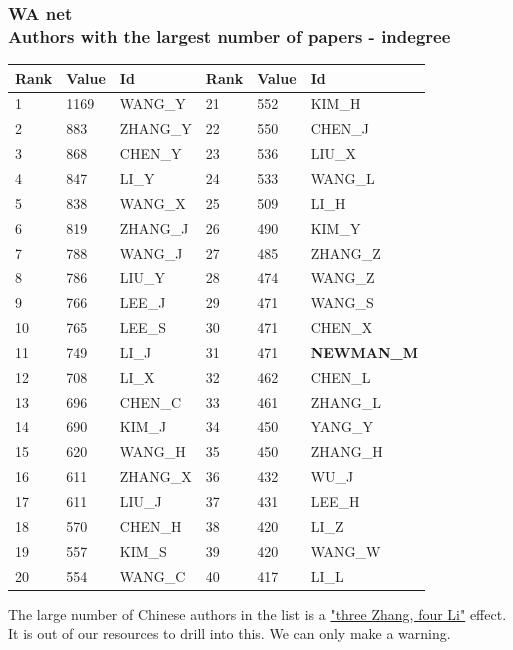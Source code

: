 \documentclass[hyperref={pdfstartview={FitBH -32768},
                         pdfpagemode=FullScreen,
                         plainpages=false,
                         colorlinks=true}
              ]{beamer}
\begin{document}
\begin{frame}[fragile]
\frametitle{WA net \label{numpap}\\ \normalsize Authors with the largest number of papers - indegree}
\renewcommand{\arraystretch}{0.82}
\tiny
\begin{center}
\begin{tabular}{l|l|l||l|l|l}
Rank& 	Value& 	Id& 	Rank& 	Value& 	Id\\  \hline   
1& 	1169& 	WANG\_Y& 	21& 	552& 	KIM\_H\\ 
2& 	883& 	ZHANG\_Y& 	22& 	550& 	CHEN\_J\\ 
3& 	868& 	CHEN\_Y& 	23& 	536& 	LIU\_X\\ 
4& 	847& 	LI\_Y& 	24& 	533& 	WANG\_L\\ 
5& 	838& 	WANG\_X& 	25& 	509& 	LI\_H\\ 
6& 	819& 	ZHANG\_J& 	26& 	490& 	KIM\_Y\\ 
7& 	788& 	WANG\_J& 	27& 	485& 	ZHANG\_Z\\ 
8& 	786& 	LIU\_Y& 	28& 	474& 	WANG\_Z\\ 
9& 	766& 	LEE\_J& 	29& 	471& 	WANG\_S\\ 
10& 	765& 	LEE\_S& 	30& 	471& 	CHEN\_X\\ 
11& 	749& 	LI\_J& 	31& 	471& 	\textbf{NEWMAN\_M}\\ 
12& 	708& 	LI\_X& 	32& 	462& 	CHEN\_L\\ 
13& 	696& 	CHEN\_C& 	33& 	461& 	ZHANG\_L\\ 
14& 	690& 	KIM\_J& 	34& 	450& 	YANG\_Y\\ 
15& 	620& 	WANG\_H& 	35& 	450& 	ZHANG\_H\\ 
16& 	611& 	ZHANG\_X& 	36& 	432& 	WU\_J\\ 
17& 	611& 	LIU\_J& 	37& 	431& 	LEE\_H\\ 
18& 	570& 	CHEN\_H& 	38& 	420& 	LI\_Z\\ 
19& 	557& 	KIM\_S& 	39& 	420& 	WANG\_W\\ 
20& 	554& 	WANG\_C& 	40& 	417& 	LI\_L\\ \hline  
\end{tabular}
\end{center}

\medskip
\footnotesize
The large number of Chinese authors in the list is a \href{https://en.wikipedia.org/wiki/List_of_common_Chinese_surnames}{"three Zhang, four Li"} effect. It is out of our resources to drill into this. We can only make a warning.
\end{frame}
\end{document}
